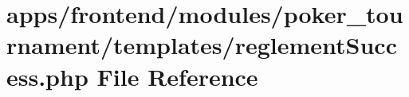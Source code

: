 \hypertarget{frontend_2modules_2poker__tournament_2templates_2reglement_success_8php}{\section{apps/frontend/modules/poker\-\_\-tournament/templates/reglement\-Success.php File Reference}
\label{frontend_2modules_2poker__tournament_2templates_2reglement_success_8php}
}
